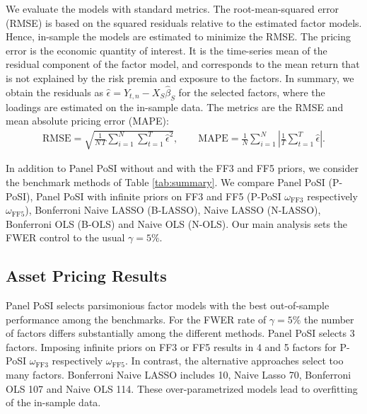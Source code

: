 \documentclass[11pt]{article}
\begin{document}
We evaluate the models with standard metrics. The root-mean-squared error (RMSE) is based on the squared residuals relative to the estimated factor models. Hence, in-sample the models are estimated to minimize the RMSE. The pricing error is the economic quantity of interest. It is the time-series mean of the residual component of the factor model, and corresponds to the mean return that is not explained by the risk premia and exposure to the factors. In summary, we obtain the residuals as $\hat \epsilon =Y_{t,n}- X_S \hat \beta_S$ for the selected factors, where the loadings are estimated on the in-sample data. The metrics are the RMSE and mean absolute pricing error (MAPE):
\begin{align*}
	\text{RMSE}= \sqrt{ \frac{1}{N \, T}\sum_{i=1}^N \sum_{t=1}^T \hat \epsilon ^2}, \qquad \text{MAPE} = \frac{1}{N } \sum_{i=1}^N \left | \frac{1}{T} \sum_{t=1}^T \hat \epsilon  \right |.
\end{align*}

In addition to Panel PoSI without and with the FF3 and FF5 priors, we consider the benchmark methods of Table \ref{tab:summary}. We compare Panel PoSI (P-PoSI), Panel PoSI with infinite priors on FF3 and FF5 (P-PoSI $\omega_{\text{FF3}}$ respectively $\omega_{\text{FF5}}$), Bonferroni Naive LASSO (B-LASSO), Naive LASSO (N-LASSO), Bonferroni OLS (B-OLS) and Naive OLS (N-OLS). Our main analysis sets the FWER control to the usual $\gamma=5\%$.




%
%
%
%
%




\subsection{Asset Pricing Results}


Panel PoSI selects parsimonious factor models with the best out-of-sample performance among the benchmarks. For the FWER rate of $\gamma=5\%$ the number of factors differs substantially among the different methods. Panel PoSI selects 3 factors. Imposing infinite priors on FF3 or FF5 results in 4 and 5 factors for P-PoSI $\omega_{\text{FF3}}$ respectively $\omega_{\text{FF5}}$. In contrast, the alternative approaches select too many factors. Bonferroni Naive LASSO includes 10, Naive Lasso 70, Bonferroni OLS 107 and Naive OLS 114. These over-parametrized models lead to overfitting of the in-sample data.
\end{document}
